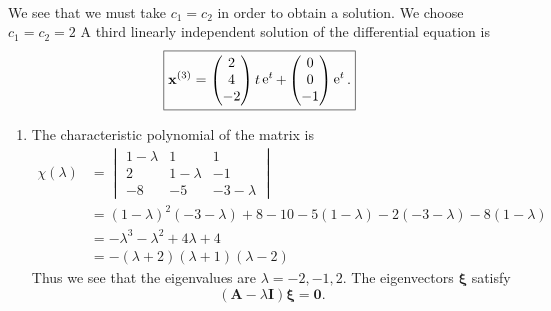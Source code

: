 {\begin{Solution}
\begin{enumerate}
\begin{enumerate}
\begin{gather*}
      \end{gather*}
      We see that we must take $c_1 = c_2$ in order to obtain a solution.  We choose
      $c_1 = c_2 = 2$
      A third linearly independent solution of the differential equation is
      \[
      \boxed{
        \mathbf{x}^{(3)} = 
        \begin{pmatrix}
          2 \\
          4 \\
          -2
        \end{pmatrix} t \mathop{\mathrm{e}}\nolimits^t + 
        \begin{pmatrix}
          0 \\
          0 \\
          -1
        \end{pmatrix} \mathop{\mathrm{e}}\nolimits^t.
        }
      \]
    \end{enumerate}
  \end{enumerate}
\end{Solution}











\begin{Solution}
  \label{solution dxdt=Ax x0=x0}
  \begin{enumerate}
  \item
    The characteristic polynomial of the matrix is
    \begin{align*}
      \chi(\lambda)
      &= \begin{vmatrix}
        1 - \lambda  & 1             & 1 \\
        2               & 1 - \lambda        & -1 \\
        -8              & -5            & -3 - \lambda
      \end{vmatrix} \\
      &= (1-\lambda)^2 (-3 - \lambda) + 8 -10 -5 (1-\lambda)
      -2 (-3-\lambda) - 8 (1-\lambda) \\
      &= -\lambda^3 - \lambda^2 + 4 \lambda + 4 \\
      &= - (\lambda + 2)(\lambda + 1)(\lambda - 2)
    \end{align*}
    Thus we see that the eigenvalues are $\lambda = -2, -1, 2$.  
    The eigenvectors $\boldsymbol{\xi}$ satisfy  
    \[
    ( \mathbf{A}  - \lambda \mathbf{I} ) \boldsymbol{\xi} = \mathbf{0}.
    \]


\end{enumerate}
\end{Solution}}
